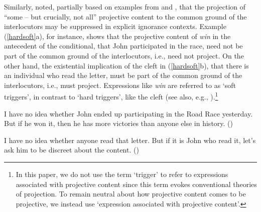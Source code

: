 \documentclass[11pt,fleqn]{article}
\newcommand{\6}{\mbox{$[\hspace*{-.6mm}[$}}
\newcommand{\9}{\mbox{$]\hspace*{-.6mm}]$}}
\def\infelic{{\leavevmode\llap{\#}}}
\begin{document}
Similarly, \citet[432]{simons01} noted, partially based on examples from \citealt{ccmg90} and \citealt{geurts94}, that the projection of ``some -- but crucially, not all'' projective content to the common ground of the interlocutors may be suppressed in explicit ignorance contexts. Example (\ref{hardsoft}a), for instance, shows that the projective content of {\em win} in the antecedent of the conditional, that John participated in the race, need not be part of the common ground of the interlocutors, i.e., need not project. On the other hand, the existential implication of the cleft in (\ref{hardsoft}b), that there is an individual who read the letter, must be part of the common ground of the interlocutors, i.e., must project. Expressions like {\em win} are referred to as `soft triggers', in contrast to `hard triggers', like the cleft (see also, e.g., \citealt{abusch10,abrusan2016}).\footnote{In this paper, we do not use the term `trigger' to refer to expressions associated with projective content since this term evokes conventional theories of projection. To remain neutral about how projective content comes to be projective, we instead use `expression associated with projective content'.}

\begin{exe}
\ex\label{hardsoft}
\begin{xlist}

\ex I have no idea whether John ended up participating in the Road Race yesterday. But if he won it, then he has more victories than anyone else in history. \hfill (\citealt[39]{abusch10})

\ex\infelic I have no idea whether anyone read that letter. But if it is John
who read it, let's ask him to be discreet about the content. \hfill (\citealt[40]{abusch10})

\end{xlist}
\end{exe}
\end{document}

